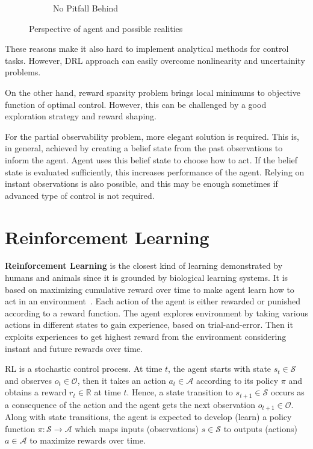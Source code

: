 \documentclass[a4paper, 12pt]{article} %
\begin{document}
\begin{figure}
\begin{subfigure}{.32\textwidth}
		\caption{No Pitfall Behind}
		\label{fig:no_pitfall_behind}
	\end{subfigure}
	\caption{Perspective of agent and possible realities}
	\label{fig:partial_obs_pitfall}
\end{figure}

These reasons make it also hard to implement analytical methods for control tasks. 
However, DRL approach can easily overcome nonlinearity and uncertainity problems.

On the other hand, reward sparsity problem brings local minimums to objective function of optimal control. However, this can be challenged by a good exploration strategy and reward shaping. 

For the partial observability problem, more elegant solution is required. 
This is, in general, achieved by creating a belief state from the past observations to inform the agent. 
Agent uses this belief state to choose how to act. 
If the belief state is evaluated sufficiently, 
this increases performance of the agent.
Relying on instant observations is also possible, 
and this may be enough sometimes if advanced type of control is not required. 

\section{Reinforcement Learning}

\textbf{Reinforcement Learning} is the closest kind of learning demonstrated by humans and animals 
since it is grounded by biological learning systems. 
It is based on maximizing cumulative reward over time to make agent 
learn how to act in an environment~\cite{sutton_reinforcement_1998}. 
Each action of the agent is either rewarded or punished according to a reward function. 
The agent explores environment by taking various actions in different states to gain experience, based on trial-and-error. 
Then it exploits experiences to get highest reward from the environment considering instant and future rewards over time. 

RL is a stochastic control process. 
At time $t$, the agent starts with state $s_t \in \mathcal{S}$ and observes $o_t \in \mathcal{O}$, 
then it takes an action $a_t \in \mathcal{A}$ according to its policy $\pi$ and obtains a reward $r_t \in \mathbb{R}$ at time $t$. 
Hence, a state transition to $s_{t+1} \in \mathcal{S}$ occurs as a consequence of the action and the agent gets the next observation $o_{t+1} \in \mathcal{O}$. 
Along with state transitions, the agent is expected to develop (learn) a policy function 
$\pi \colon \mathcal{S} \rightarrow \mathcal{A}$ which maps 
inputs (observations) $s \in \mathcal{S}$ to outputs (actions) $a \in \mathcal{A}$ to maximize rewards over time.
\end{document}
